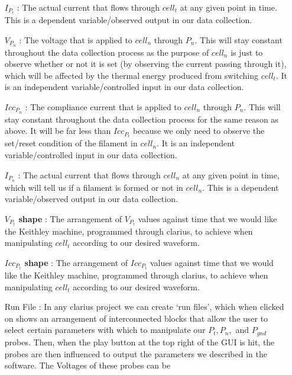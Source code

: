 \documentclass{article}
\begin{document}
\begin{enumerate}
          \item[\textbf{$I_{P_t}$} :] The actual current that flows through $cell_t$ at any given point in time. This is
            a dependent variable/observed output in our data collection. 
          \item [\textbf{$V_{P_n}$} :] The voltage that is applied to $cell_n$ through $P_n$. This will stay constant
            throughout the data collection process as the purpose of $cell_n$ is just to observe whether or not it is
            set (by observing the current passing through it), which will be affected by the thermal energy produced
            from switching $cell_t$. It is an independent variable/controlled input in our data collection.
          \item [\textbf{$Icc_{P_n}$} :] The compliance current that is applied to $cell_n$ through $P_n$. This will
            stay constant throughout the data collection process for the same reason as above. It will be far less than
            $Icc_{P_t}$ because we only need to observe the set/reset condition of the filament in $cell_n$. It is an
            independent variable/controlled input in our data collection.
          \item[\textbf{$I_{P_n}$} :] The actual current that flows through $cell_n$ at any given point in time, which
            will tell us if a filament is formed or not in $cell_n$. This is a dependent variable/observed output in our
            data collection.
          \item[\textbf{$V_{P_t}$ shape} :] The arrangement of $V_{P_t}$ values against time that we would like the
            Keithley machine, programmed through clarius, to achieve when manipulating $cell_t$ according to our desired
            waveform.
          \item[\textbf{$Icc_{P_t}$ shape} :] The arrangement of $Icc_{P_t}$ values against time that we would like the
            Keithley machine, programmed through clarius, to achieve when manipulating $cell_t$ according to our desired
            waveform.
          \item[Run File :] In any clarius project we can create `run files', which when clicked on shows an arrangement
            of interconnected blocks that allow the user to select certain parameters with which to manipulate our $P_t,
            P_n,$ and $P_{gnd}$ probes. Then, when the play button at the top right of the GUI is hit, the probes are
            then influenced to output the parameters we described in the software. The Voltages of these probes can be

\end{enumerate}
\end{document}
